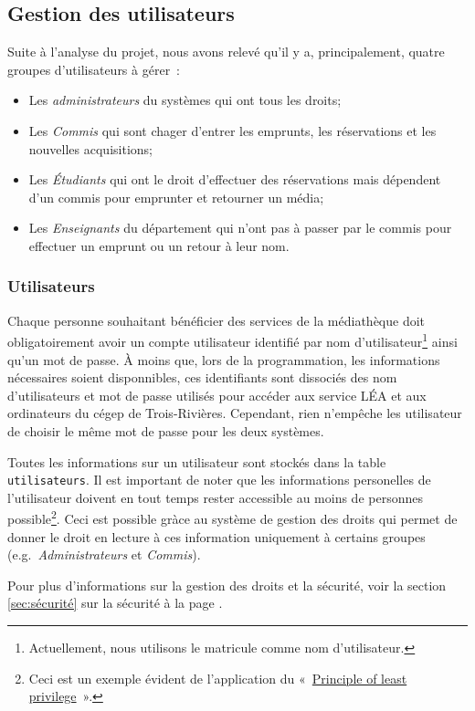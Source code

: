 \documentclass[letter, 11pt]{report}
\begin{document}
\subsection{Gestion des utilisateurs}

Suite à l'analyse du projet, nous avons relevé qu'il y a, principalement, quatre groupes d'utilisateurs à gérer~:
\begin{itemize}
	\item Les \emph{administrateurs} du systèmes qui ont tous les droits;
	\item Les \emph{Commis} qui sont chager d'entrer les emprunts, les réservations et les nouvelles acquisitions;
	\item Les \emph{Étudiants} qui ont le droit d'effectuer des réservations mais dépendent d'un commis pour emprunter et retourner un média;
	\item Les \emph{Enseignants} du département qui n'ont pas à passer par le commis pour effectuer un emprunt ou un retour à leur nom.
\end{itemize}

\subsubsection{Utilisateurs}
Chaque personne souhaitant bénéficier des services de la médiathèque doit obligatoirement avoir un compte utilisateur identifié par nom d'utilisateur\footnote{Actuellement, nous utilisons le matricule comme nom d'utilisateur.} ainsi qu'un mot de passe. À moins que, lors de la programmation, les informations nécessaires soient disponnibles, ces identifiants sont dissociés des nom d'utilisateurs et mot de passe utilisés pour accéder aux service LÉA et aux ordinateurs du cégep de Trois-Rivières. Cependant, rien n'empêche les utilisateur de choisir le même mot de passe pour les deux systèmes.

Toutes les informations sur un utilisateur sont stockés dans la table \texttt{utilisateurs}. Il est important de noter que les informations personelles de l'utilisateur doivent en tout temps rester accessible au moins de personnes possible\footnote{Ceci est un exemple évident de l'application du «~\href{http://en.wikipedia.org/wiki/Principle_of_least_privilege}{Principle of least privilege}~».}. Ceci est possible gràce au système de gestion des droits qui permet de donner le droit en lecture à ces information uniquement à certains groupes (e.g.\ \emph{Administrateurs} et \emph{Commis}).

Pour plus d'informations sur la gestion des droits et la sécurité, voir la section \ref{sec:sécurité} sur la sécurité à la page \pageref{sec:sécurité}.
\end{document}
